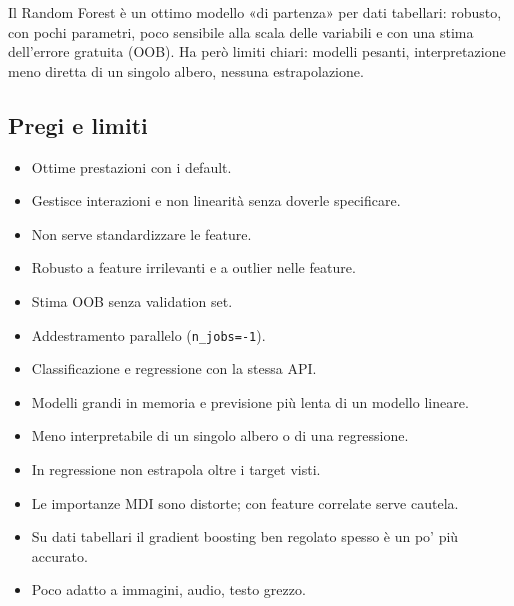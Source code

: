 
\begin{inbreve}
Il Random Forest è un ottimo modello «di partenza» per dati tabellari: robusto, con pochi parametri, poco sensibile alla scala delle variabili e con una stima dell'errore gratuita (OOB). Ha però limiti chiari: modelli pesanti, interpretazione meno diretta di un singolo albero, nessuna estrapolazione.
\end{inbreve}

\subsection{Pregi e limiti}

\begin{center}
\begin{tcbraster}[raster columns=2,raster equal height,raster column skip=10pt]
\begin{tcolorbox}[enhanced,unbreakable,arc=4pt,boxrule=0pt,colback=verde!7,borderline west={3pt}{0pt}{verde},
  title={\ding{51}\ \ Pregi},fonttitle=\headfont\bfseries\small,colbacktitle=verde,coltitle=white,fontupper=\small]
\begin{itemize}
  \item Ottime prestazioni con i default.
  \item Gestisce interazioni e non linearità senza doverle specificare.
  \item Non serve standardizzare le feature.
  \item Robusto a feature irrilevanti e a outlier nelle feature.
  \item Stima OOB senza validation set.
  \item Addestramento parallelo (\texttt{n\_jobs=-1}).
  \item Classificazione e regressione con la stessa API.
\end{itemize}
\end{tcolorbox}
\begin{tcolorbox}[enhanced,unbreakable,arc=4pt,boxrule=0pt,colback=rosso!6,borderline west={3pt}{0pt}{rosso},
  title={\ding{55}\ \ Limiti},fonttitle=\headfont\bfseries\small,colbacktitle=rosso,coltitle=white,fontupper=\small]
\begin{itemize}
  \item Modelli grandi in memoria e previsione più lenta di un modello lineare.
  \item Meno interpretabile di un singolo albero o di una regressione.
  \item In regressione non estrapola oltre i target visti.
  \item Le importanze MDI sono distorte; con feature correlate serve cautela.
  \item Su dati tabellari il gradient boosting ben regolato spesso è un po' più accurato.
  \item Poco adatto a immagini, audio, testo grezzo.
\end{itemize}
\end{tcolorbox}
\end{tcbraster}
\end{center}

